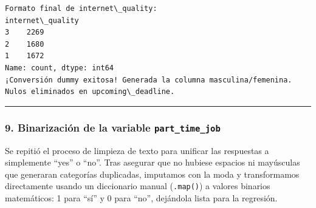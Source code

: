 \documentclass[11pt]{article}
\begin{document}
    \begin{Verbatim}[commandchars=\\\{\}]
Formato final de internet\_quality:
internet\_quality
3    2269
2    1680
1    1672
Name: count, dtype: int64
¡Conversión dummy exitosa! Generada la columna masculina/femenina.
Nulos eliminados en upcoming\_deadline.
    \end{Verbatim}

    \begin{center}\rule{0.5\linewidth}{0.5pt}\end{center}

\subsubsection{\texorpdfstring{9. Binarización de la variable
\texttt{part\_time\_job}}{9. Binarización de la variable part\_time\_job}}\label{binarizaciuxf3n-de-la-variable-part_time_job}

Se repitió el proceso de limpieza de texto para unificar las respuestas
a simplemente ``yes'' o ``no''. Tras asegurar que no hubiese espacios ni
mayúsculas que generaran categorías duplicadas, imputamos con la moda y
transformamos directamente usando un diccionario manual
(\texttt{.map()}) a valores binarios matemáticos: 1 para ``sí'' y 0 para
``no'', dejándola lista para la regresión.
\end{document}
